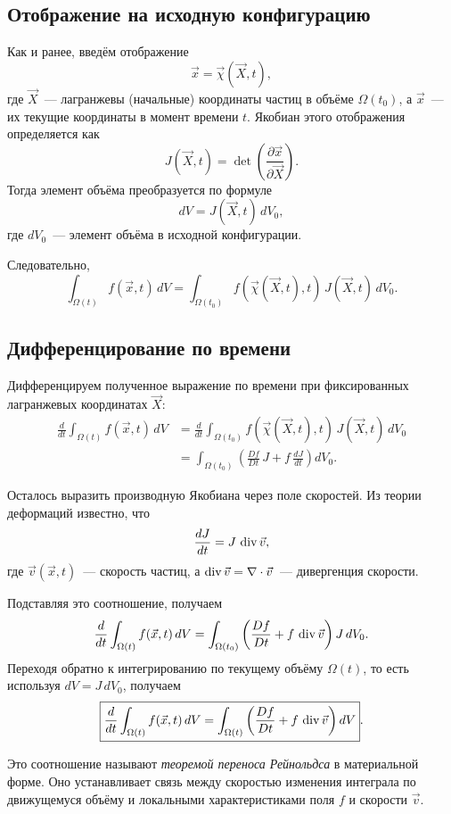 \subsection{Отображение на исходную конфигурацию}

Как и ранее, введём отображение
\[
  \vec{x} = \vec{\chi}(\vec{X}, t),
\]
где \(\vec{X}\)~— лагранжевы (начальные) координаты частиц в
объёме \(\Omega(t_0)\), а \(\vec{x}\)~— их текущие координаты в
момент времени \(t\). Якобиан этого отображения определяется как
\[
  J(\vec{X},t)
    = \det\!\left(
        \frac{\partial \vec{x}}{\partial \vec{X}}
      \right).
\]
Тогда элемент объёма преобразуется по формуле
\[
  dV = J(\vec{X},t)\, dV_0,
\]
где \(dV_0\)~— элемент объёма в исходной конфигурации.

Следовательно,
\[
  \int_{\Omega(t)} f(\vec{x}, t)\, dV
    = \int_{\Omega(t_0)} f(\vec{\chi}(\vec{X}, t), t)\,
      J(\vec{X}, t)\, dV_0.
\]

\subsection{Дифференцирование по времени}

Дифференцируем полученное выражение по времени при фиксированных
лагранжевых координатах \(\vec{X}\):
\begin{align*}
  \frac{d}{dt} \int_{\Omega(t)} f(\vec{x}, t)\, dV
   &= \frac{d}{dt}
      \int_{\Omega(t_0)} f(\vec{\chi}(\vec{X}, t), t)\,
         J(\vec{X}, t)\, dV_0 \\
   &= \int_{\Omega(t_0)}
       \left(
          \frac{D f}{D t}\, J
          + f\, \frac{dJ}{dt}
       \right) dV_0.
\end{align*}

Осталось выразить производную Якобиана через поле скоростей.
Из теории деформаций известно, что
\[
  \frac{dJ}{dt} = J\, \operatorname{div} \vec{v},
\]
где \(\vec{v}(\vec{x},t)\)~— скорость частиц, а
\(\operatorname{div}\vec{v} = \nabla\cdot\vec{v}\)~— дивергенция скорости.

Подставляя это соотношение, получаем
\[
  \frac{d}{dt} \int_{\Omega(t)} f(\vec{x}, t)\, dV
   = \int_{\Omega(t_0)}
      \left(
        \frac{D f}{D t}
        + f\, \operatorname{div} \vec{v}
      \right) J\, dV_0.
\]
Переходя обратно к интегрированию по текущему объёму
\(\Omega(t)\), то есть используя \(dV = J\, dV_0\), получаем
\[
  \boxed{
  \frac{d}{dt} \int_{\Omega(t)} f(\vec{x}, t)\, dV
   = \int_{\Omega(t)}
      \left(
        \frac{D f}{D t}
        + f\, \operatorname{div} \vec{v}
      \right) dV
  }.
\]

Это соотношение называют \emph{теоремой переноса Рейнольдса} в
материальной форме. Оно устанавливает связь между скоростью
изменения интеграла по движущемуся объёму и локальными
характеристиками поля \(f\) и скорости \(\vec{v}\).

